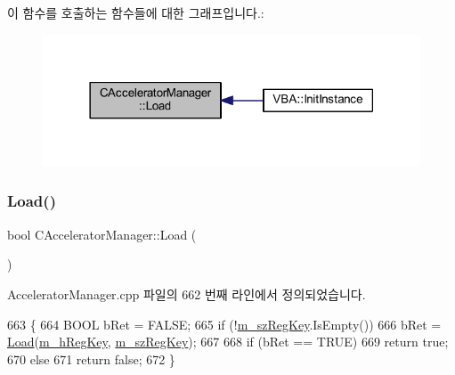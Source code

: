 이 함수를 호출하는 함수들에 대한 그래프입니다.\+:
\nopagebreak
\begin{figure}[H]
\begin{center}
\leavevmode
\includegraphics[width=318pt]{class_c_accelerator_manager_a8e87ae6f5464a4fa052c91c0ee361b6d_icgraph}
\end{center}
\end{figure}
\mbox{\label{class_c_accelerator_manager_a289a9052abea7302d9322283f93cbce6}} 
\subsubsection{\texorpdfstring{Load()}{Load()}\hspace{0.1cm}{\footnotesize\ttfamily [2/2]}}
{\footnotesize\ttfamily bool C\+Accelerator\+Manager\+::\+Load (\begin{DoxyParamCaption}{ }\end{DoxyParamCaption})}



Accelerator\+Manager.\+cpp 파일의 662 번째 라인에서 정의되었습니다.


\begin{DoxyCode}
663 \{
664   BOOL bRet = FALSE;
665   \textcolor{keywordflow}{if} (!\mbox{\hyperlink{class_c_accelerator_manager_a03a6d0e43bcfb63cf1a23ad12cb5aa35}{m\_szRegKey}}.IsEmpty())
666     bRet = \mbox{\hyperlink{class_c_accelerator_manager_a289a9052abea7302d9322283f93cbce6}{Load}}(\mbox{\hyperlink{class_c_accelerator_manager_a2652d64c947f7f3474b3aa054861b34b}{m\_hRegKey}}, \mbox{\hyperlink{class_c_accelerator_manager_a03a6d0e43bcfb63cf1a23ad12cb5aa35}{m\_szRegKey}});
667 
668   \textcolor{keywordflow}{if} (bRet == TRUE)
669     \textcolor{keywordflow}{return} \textcolor{keyword}{true};
670   \textcolor{keywordflow}{else}
671     \textcolor{keywordflow}{return} \textcolor{keyword}{false};
672 \}
\end{DoxyCode}
\mbox{\label{class_c_accelerator_manager_a11c56cbcdfac0008ecb4aef10ba51ae8}} 

